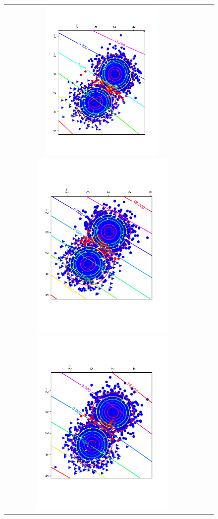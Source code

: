 \documentclass[uplatex,a4paper]{jsarticle}
\begin{document}
\begin{figure}[H]
\begin{center}
\begin{tabular}{ccc}
\begin{minipage}{0.33\linewidth}
\includegraphics[width=6cm]{Model1_10.pdf}
\end{minipage}
\begin{minipage}{0.33\linewidth}
\includegraphics[width=7cm]{Model1_30.pdf}
\end{minipage}
\begin{minipage}{0.33\linewidth}
\includegraphics[width=7cm]{Model1_50.pdf}

\end{minipage}
\end{tabular}
\end{center}
\end{figure}
\end{document}
